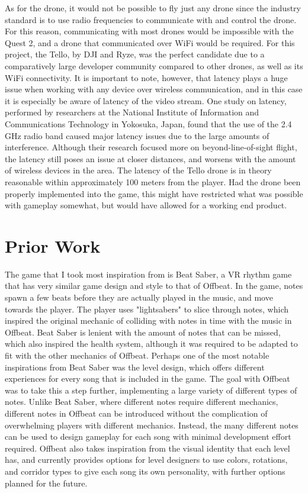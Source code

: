 \documentclass[10pt,twocolumn]{article}
\begin{document}
As for the drone, it would not be possible to fly just any drone since the industry standard is to use radio frequencies to communicate with and control the drone. For this reason, communicating with most drones would be impossible with the Quest 2, and a drone that communicated over WiFi would be required. For this project, the Tello, by DJI and Ryze, was the perfect candidate due to a comparatively large developer community compared to other drones, as well as its WiFi connectivity. It is important to note, however, that latency plays a huge issue when working with any device over wireless communication, and in this case it is especially be aware of latency of the video stream. One study on latency\cite{LatencyDroneBLOS}, performed by researchers at the National Institute of Information and Communications Technology in Yokosuka, Japan, found that the use of the 2.4 GHz radio band caused major latency issues due to the large amounts of interference. Although their research focused more on beyond-line-of-sight flight, the latency still poses an issue at closer distances, and worsens with the amount of wireless devices in the area. The latency of the Tello drone is in theory reasonable within approximately 100 meters from the player. Had the drone been properly implemented into the game, this might have restricted what was possible with gameplay somewhat, but would have allowed for a working end product.

\section{Prior Work}
The game that I took most inspiration from is Beat Saber, a VR rhythm game that has very similar game design and style to that of Offbeat. In the game, notes spawn a few beats before they are actually played in the music, and move towards the player. The player uses "lightsabers" to slice through notes, which inspired the original mechanic of colliding with notes in time with the music in Offbeat. Beat Saber is lenient with the amount of notes that can be missed, which also inspired the health system, although it was required to be adapted to fit with the other mechanics of Offbeat. Perhaps one of the most notable inspirations from Beat Saber was the level design, which offers different experiences for every song that is included in the game. The goal with Offbeat was to take this a step further, implementing a large variety of different types of notes. Unlike Beat Saber, where different notes require different mechanics, different notes in Offbeat can be introduced without the complication of overwhelming players with different mechanics. Instead, the many different notes can be used to design gameplay for each song with minimal development effort required. Offbeat also takes inspiration from the visual identity that each level has, and currently provides options for level designers to use colors, rotations, and corridor types to give each song its own personality, with further options planned for the future.
\end{document}

